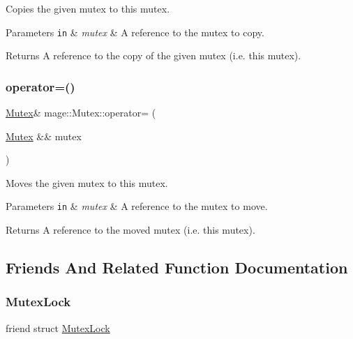 Copies the given mutex to this mutex.


\begin{DoxyParams}[1]{Parameters}
\mbox{\tt in}  & {\em mutex} & A reference to the mutex to copy. \\
\hline
\end{DoxyParams}
\begin{DoxyReturn}{Returns}
A reference to the copy of the given mutex (i.\+e. this mutex). 
\end{DoxyReturn}
\hypertarget{structmage_1_1_mutex_aaef0078f5b70afb0e5a290a5b5f33680}{}\label{structmage_1_1_mutex_aaef0078f5b70afb0e5a290a5b5f33680} 
\subsubsection{\texorpdfstring{operator=()}{operator=()}\hspace{0.1cm}{\footnotesize\ttfamily [2/2]}}
{\footnotesize\ttfamily \hyperlink{structmage_1_1_mutex}{Mutex}\& mage\+::\+Mutex\+::operator= (\begin{DoxyParamCaption}\item[{\hyperlink{structmage_1_1_mutex}{Mutex} \&\&}]{mutex }\end{DoxyParamCaption})\hspace{0.3cm}{\ttfamily [delete]}}

Moves the given mutex to this mutex.


\begin{DoxyParams}[1]{Parameters}
\mbox{\tt in}  & {\em mutex} & A reference to the mutex to move. \\
\hline
\end{DoxyParams}
\begin{DoxyReturn}{Returns}
A reference to the moved mutex (i.\+e. this mutex). 
\end{DoxyReturn}


\subsection{Friends And Related Function Documentation}
\hypertarget{structmage_1_1_mutex_a058473d070063e5098732f355f432bd9}{}\label{structmage_1_1_mutex_a058473d070063e5098732f355f432bd9} 
\subsubsection{\texorpdfstring{Mutex\+Lock}{MutexLock}}
{\footnotesize\ttfamily friend struct \hyperlink{structmage_1_1_mutex_lock}{Mutex\+Lock}\hspace{0.3cm}{\ttfamily [friend]}}



